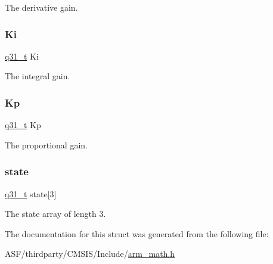 The derivative gain. \mbox{\label{structarm__pid__instance__q31_a84a6c05c16369c905193da0d5fc9a7b0}} 
\subsubsection{\texorpdfstring{Ki}{Ki}}
{\footnotesize\ttfamily \mbox{\hyperlink{arm__math_8h_adc89a3547f5324b7b3b95adec3806bc0}{q31\+\_\+t}} Ki}

The integral gain. \mbox{\label{structarm__pid__instance__q31_a6ec4b37fe2246a7e017dd07578fe5bbd}} 
\subsubsection{\texorpdfstring{Kp}{Kp}}
{\footnotesize\ttfamily \mbox{\hyperlink{arm__math_8h_adc89a3547f5324b7b3b95adec3806bc0}{q31\+\_\+t}} Kp}

The proportional gain. \mbox{\label{structarm__pid__instance__q31_af0a2da4da9a94af652873ec7e7be4880}} 
\subsubsection{\texorpdfstring{state}{state}}
{\footnotesize\ttfamily \mbox{\hyperlink{arm__math_8h_adc89a3547f5324b7b3b95adec3806bc0}{q31\+\_\+t}} state\mbox{[}3\mbox{]}}

The state array of length 3. 

The documentation for this struct was generated from the following file\+:\begin{DoxyCompactItemize}
\item 
A\+S\+F/thirdparty/\+C\+M\+S\+I\+S/\+Include/\mbox{\hyperlink{arm__math_8h}{arm\+\_\+math.\+h}}\end{DoxyCompactItemize}
